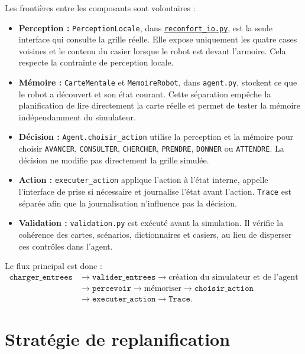 \documentclass[11pt,a4paper]{article}
\begin{document}
Les frontières entre les composants sont volontaires :

\begin{itemize}
  \item \textbf{Perception :} \texttt{PerceptionLocale}, dans
  \href{run:reconfort_io.py}{\texttt{reconfort\_io.py}}, est la seule
  interface qui consulte la grille réelle. Elle expose uniquement les quatre
  cases voisines et le contenu du casier lorsque le robot est devant
  l'armoire. Cela respecte la contrainte de perception locale.

  \item \textbf{Mémoire :} \texttt{CarteMentale} et
  \texttt{MemoireRobot}, dans \texttt{agent.py}, stockent ce que le robot a
  découvert et son état courant. Cette séparation empêche la planification de
  lire directement la carte réelle et permet de tester la mémoire
  indépendamment du simulateur.

  \item \textbf{Décision :} \texttt{Agent.choisir\_action} utilise la
  perception et la mémoire pour choisir \texttt{AVANCER},
  \texttt{CONSULTER}, \texttt{CHERCHER}, \texttt{PRENDRE},
  \texttt{DONNER} ou \texttt{ATTENDRE}. La décision ne modifie pas
  directement la grille simulée.

  \item \textbf{Action :} \texttt{executer\_action} applique l'action à
  l'état interne, appelle l'interface de prise si nécessaire et journalise
  l'état avant l'action. \texttt{Trace} est séparée afin que la journalisation
  n'influence pas la décision.

  \item \textbf{Validation :} \texttt{validation.py} est exécuté avant la
  simulation. Il vérifie la cohérence des cartes, scénarios, dictionnaires et
  casiers, au lieu de disperser ces contrôles dans l'agent.
\end{itemize}

Le flux principal est donc :
\[
\begin{aligned}
\texttt{charger\_entrees}
&\longrightarrow \texttt{valider\_entrees}
\longrightarrow \text{création du simulateur et de l'agent}\\
&\longrightarrow \texttt{percevoir}
\longrightarrow \text{mémoriser}
\longrightarrow \texttt{choisir\_action}\\
&\longrightarrow \texttt{executer\_action}
\longrightarrow \texttt{Trace}.
\end{aligned}
\]

\section{Stratégie de replanification}
\end{document}
